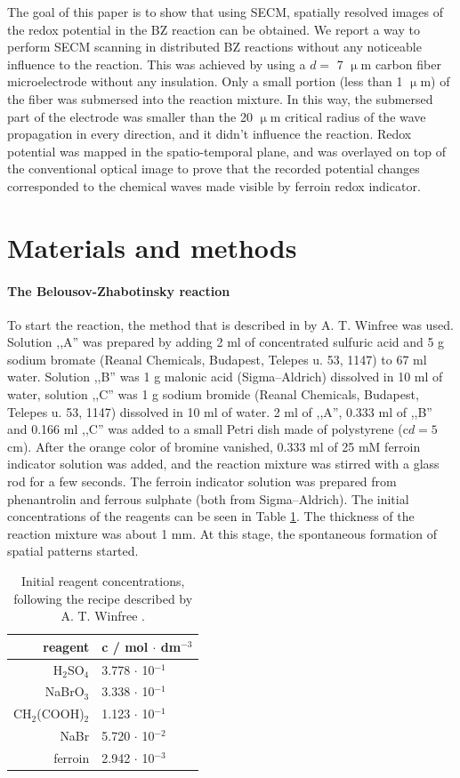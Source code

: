\documentclass[3p]{elsarticle}
\begin{document}
The goal of this paper is to show that using SECM, spatially resolved images of the redox potential in the BZ reaction can be obtained.
We report a way to perform SECM scanning in distributed BZ reactions without any noticeable influence to the reaction.
This was achieved by using a $d=$ 7 $\upmu$m carbon fiber microelectrode without any insulation.
Only a small portion (less than 1 $\upmu$m) of the fiber was submersed into the reaction mixture.
In this way, the submersed part of the electrode was smaller than the 20 $\upmu$m critical radius of the wave propagation \cite{foerster1989critical} in every direction, and it didn't influence the reaction.
Redox potential was mapped in the spatio-temporal plane, and was overlayed on top of the conventional optical image to prove that the recorded potential changes corresponded to the chemical waves made visible by ferroin redox indicator.

\section{Materials and methods}
\paragraph{The Belousov-Zhabotinsky reaction} To start the reaction, the method that is described in \cite{winfree2001geometry} by A. T. Winfree was used.
Solution ,,A'' was prepared by adding 2 ml of concentrated sulfuric acid and 5 g sodium bromate (Reanal Chemicals, Budapest, Telepes u. 53, 1147) to 67 ml water.
Solution ,,B'' was 1 g malonic acid (Sigma--Aldrich) dissolved in 10 ml of water, solution ,,C'' was 1 g sodium bromide (Reanal Chemicals, Budapest, Telepes u. 53, 1147) dissolved in 10 ml of water.
2 ml of ,,A'', 0.333 ml of ,,B'' and 0.166 ml ,,C'' was added to a small Petri dish made of polystyrene (c$d=5 \,$cm).
After the orange color of bromine vanished, 0.333 ml of 25 mM ferroin indicator solution was added, and the reaction mixture was stirred with a glass rod for a few seconds.
The ferroin indicator solution was prepared from phenantrolin and ferrous sulphate (both from Sigma--Aldrich).
The initial concentrations of the reagents can be seen in Table \ref{table:initial}.
The thickness of the reaction mixture was about 1 mm.
At this stage, the spontaneous formation of spatial patterns started.

\begin{table}[]
\caption{Initial reagent concentrations, following the recipe described by A. T. Winfree  \cite{winfree2001geometry}.}
\centering
\begin{tabular}{rl}
reagent    & c / mol $\cdot$ dm$^{-3}$ \\ \hline
H$_2$SO$_4$      & 3.778 $\cdot$ 10$^{-1}$   \\
NaBrO$_3$     & 3.338 $\cdot$ 10$^{-1}$   \\
CH$_2$(COOH)$_2$ & 1.123 $\cdot$ 10$^{-1}$   \\
NaBr       & 5.720 $\cdot$ 10$^{-2}$    \\
ferroin    & 2.942 $\cdot$ 10$^{-3}$  
\end{tabular}
\label{table:initial}
\end{table}
\end{document}
